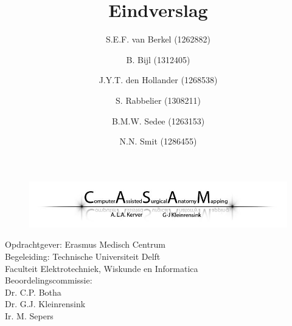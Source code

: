 \documentclass[12pt, a4paper, twoside]{article}
\title{\casamproject Eindverslag}
\author{S.E.F. van Berkel (1262882) \and B. Bijl (1312405)\and J.Y.T. den Hollander (1268538)\and S. Rabbelier (1308211)\and B.M.W. Sedee (1263153)\and N.N. Smit (1286455)}
\begin{document}
\begin{titlepage}

\begin{figure}[t]
\includegraphics[width=\textwidth]{banner}
\end{figure}

\maketitle

\thispagestyle{empty}

\begin{center}
\vspace{2cm}
\large
Opdrachtgever: Erasmus Medisch Centrum \\
Begeleiding: Technische Universiteit Delft\\
Faculteit Elektrotechniek, Wiskunde en Informatica\\

\vspace{5cm}
Beoordelingscommissie: \\
Dr. C.P. Botha \\
Dr. G.J. Kleinrensink \\
Ir. M. Sepers

\end{center}

\end{titlepage}
\newpage
\thispagestyle{empty}
\mbox{}
\newpage
\thispagestyle{empty}

\newpage

\setcounter{tocdepth}{3}

\setcounter{page}{1}
\tableofcontents

\newpage
\noindent
{}
\setcounter{page}{2}


\newpage

\newpage

\newpage

\newpage

\newpage

\newpage

\newpage

\newpage




\newpage




\end{document}

